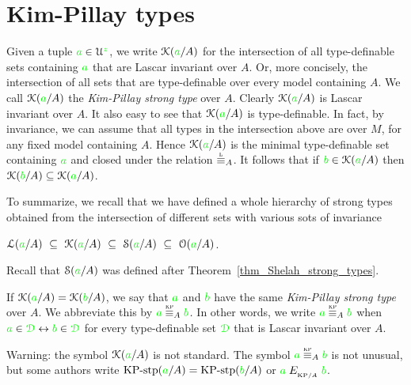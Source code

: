 \section{Kim-Pillay types}\label{KPtypes}

Given a tuple ${\color{green} a}\in\EuScript U^{\color{green} z}$, we write \emph{$\EuScript K({\color{green} a}/A)$\/} for the intersection of all type-definable sets containing ${\color{green} a}$ that are Lascar invariant over $A$.
Or, more concisely, the intersection of all sets that are type-definable over every model containing $A$.
We call $\EuScript K({\color{green} a}/A)$ the \emph{Kim-Pillay strong type\/} over $A$.
Clearly $\EuScript K({\color{green} a}/A)$ is Lascar invariant over $A$.
It also easy to see that $\EuScript K({\color{green} a}/A)$ is type-definable.
In fact, by invariance, we can assume that all types in the intersection above are over $M$, for any fixed model containing $A$.
Hence $\EuScript K({\color{green} a}/A)$ is the minimal type-definable set containing ${\color{green} a}$ and closed under the relation $\equivL_A$.
It follows that if ${\color{green} b}\in\EuScript K({\color{green} a}/A)$ then $\EuScript K({\color{green} b}/A)\subseteq\EuScript K({\color{green} a}/A)$.

To summarize, we recall that we have defined a whole hierarchy of strong types obtained from the intersection of different sets with various sots of invariance

\hfil$\Ll({\gr a}/A)\ \subseteq\ \K({\gr a}/A)\ \subseteq\ \S({\gr a}/A)\ \subseteq\ \Orbit({\gr a}/A)$. 

Recall that $\EuScript S({\color{green} a}/A)$ was defined after Theorem~\ref{thm_Shelah_strong_types}.

If $\EuScript K({\color{green} a}/A)=\EuScript K({\color{green} b}/A)$, we say that ${\color{green} a}$ and ${\color{green} b}$ have the same \emph{Kim-Pillay strong type\/} over $A$.
We abbreviate this by \emph{${\gr a}\stackrel{\smash{\scalebox{.5}{\rm KP}}}{\equiv}_A{\gr b}$.}
In other words, we write ${\gr a}\equivKP_A{\gr b}$ when ${\color{green} a}\in{\color{green}\EuScript D}\leftrightarrow{\color{green}b}\in{\color{green}\EuScript D}$ for every type-definable set ${\color{green}\EuScript D}$ that is Lascar invariant over $A$.


\noindent\llap{\textcolor{red}{\Large\warning}\kern1.5ex}%
Warning: the symbol $\EuScript K({\color{green} a}/A)$ is not standard.
The symbol ${\gr a}\equivKP_A{\gr b}$ is not unusual, but some authors write $\mbox{KP-stp}({\color{green} a}/A)=\mbox{KP-stp}({\color{green} b}/A)$ or ${\color{green} a}\mathrel{E_{_{{\rm KP}/A}}}{\color{green} b}$.


